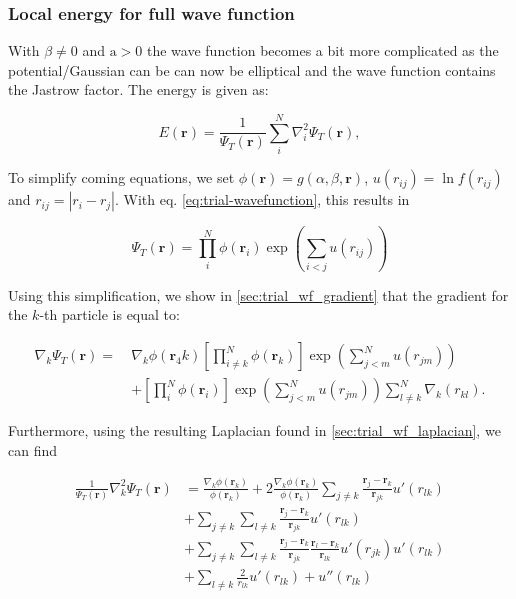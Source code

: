 \documentclass[
]{article}
\begin{document}
\hypertarget{local-energy-for-full-wave-function}{%
\subsubsection{Local energy for full wave
function}\label{local-energy-for-full-wave-function}}

With \(\beta \ne 0\) and \(\text{a} > 0\) the wave function becomes a
bit more complicated as the potential/Gaussian can be can now be
elliptical and the wave function contains the Jastrow factor. The energy
is given as:

\[ E(\mathbf{r}) = \frac{1}{\Psi_T(\mathbf{r})}\sum_i^{N}\nabla_i^2\Psi_T(\mathbf{r}), \]

To simplify coming equations, we set
\(\phi(\mathbf r) = g(\alpha, \beta, \mathbf r)\),
\(u(r_{ij}) = \ln f(r_{ij})\) and \(r_{ij} = |r_i - r_j|\). With eq.
\eqref{eq:trial-wavefunction}, this results in

\[\Psi_T(\mathbf{r})=\prod_i^N \phi(\mathbf{r}_i) \exp{\left(\sum_{i<j}u(r_{ij})\right)}\]

Using this simplification, we show in \ref{sec:trial_wf_gradient} that
the gradient for the \(k\)-th particle is equal to:

\begin{align*} 
\nabla_k \Psi_T (\mathbf{r}) =\ &\nabla_k \phi (\mathbf{r}_ 4k)\left[\prod^N_{i \ne k}{\phi(\mathbf{r}_ k)} \right] \exp \left( \sum^N _{j<m} u(r _{jm})\right) \\ &+ \left[\prod^N _i\phi(\mathbf{r}_ i)\right] \exp \left( \sum^N _ {j<m} u(r _ {jm})\right) \sum^N _ {l\ne k } \nabla_ k (r_ {kl}).
\end{align*}

Furthermore, using the resulting Laplacian found in
\ref{sec:trial_wf_laplacian}, we can find

\begin{align*}
\frac{1}{\Psi_T(\mathbf{r})} \nabla_k^2 \Psi_T(\mathbf{r}) &= \frac{\nabla_k \phi(\mathbf{r}_k)}{\phi(\mathbf{r}_k)} + 2 \frac{\nabla_k \phi(\mathbf{r}_k)}{\phi(\mathbf{r}_k)}\sum _{j\ne k}
\frac{\mathbf{r}_j - \mathbf {r}_k}{\mathbf{r} _{jk}}u'(r _{lk})\\
&+ \sum _{j\ne k}\sum _{l\ne k}
\frac{\mathbf{r}_j - \mathbf {r}_k}{\mathbf{r} _{jk}} u'(r _{lk}) \\
&+ \sum _{j\ne k}\sum _{l\ne k}
\frac{\mathbf{r}_j - \mathbf {r}_k}{\mathbf{r} _{jk}} \frac{\mathbf{r}_l - \mathbf {r}_k}{\mathbf{r} _{lk}}  u'(r _{jk})  u'(r _{lk}) \\
&+ \sum _{l\ne k} \frac{2}{r _{lk}} u'(r _{lk}) +  u''(r _{lk})
\end{align*}
\end{document}
